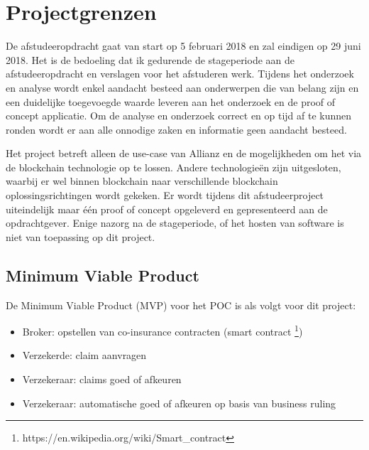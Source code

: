 \chapter{Projectgrenzen}
De afstudeeropdracht gaat van start op 5 februari 2018 en zal eindigen op 29 juni 2018. Het is de bedoeling dat ik gedurende de stageperiode aan de afstudeeropdracht en verslagen voor het afstuderen werk. Tijdens het onderzoek en analyse wordt enkel aandacht besteed aan onderwerpen die van belang zijn en een duidelijke toegevoegde waarde leveren aan het onderzoek en de proof of concept applicatie. Om de analyse en onderzoek correct en op tijd af te kunnen ronden wordt er aan alle onnodige zaken en informatie geen aandacht besteed.\par
Het project betreft alleen de use-case van Allianz en de mogelijkheden om het via de blockchain technologie op te lossen. Andere technologieën zijn uitgesloten, waarbij er wel binnen blockchain naar verschillende blockchain oplossingsrichtingen wordt gekeken. Er wordt tijdens dit afstudeerproject uiteindelijk maar één proof of concept opgeleverd en gepresenteerd aan de opdrachtgever. Enige nazorg na de stageperiode, of het hosten van software is niet van toepassing op dit project.

\section{Minimum Viable Product}
De Minimum Viable Product (MVP) voor het POC is als volgt voor dit project:
\begin{itemize}
  \item Broker: opstellen van co-insurance contracten (smart contract \footnote{https://en.wikipedia.org/wiki/Smart\_contract})
  \item Verzekerde: claim aanvragen
  \item Verzekeraar: claims goed of afkeuren
  \item Verzekeraar: automatische goed of afkeuren op basis van business ruling
\end{itemize}
